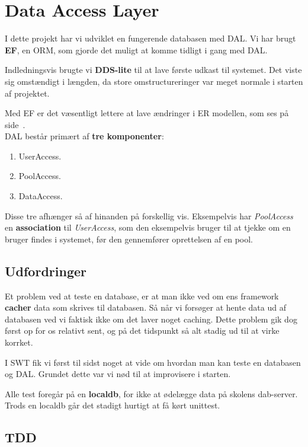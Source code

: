 \section{Data Access Layer}

I dette projekt har vi udviklet en fungerende databasen med DAL. Vi har brugt \textbf{EF}, en ORM, som gjorde det muligt at komme tidligt i gang med DAL. 

Indledningsvis brugte vi \textbf{DDS-lite} til at lave første udkast til systemet. Det viste sig omstændigt i længden, da store omstructureringer var meget normale i starten af projektet. 

Med EF er det væsentligt lettere at lave ændringer i ER modellen, som ses på side~\pageref{fig:dbmodel}.\\

DAL består primært af \textbf{tre komponenter}: 

\begin{enumerate}
	\item UserAccess.
	\item PoolAccess.
	\item DataAccess.
\end{enumerate}

Disse tre afhænger så af hinanden på forskellig vis. Eksempelvis har \textit{PoolAccess} en \textbf{association} til \textit{UserAccess}, som den eksempelvis bruger til at tjekke om en bruger findes i systemet, før den gennemfører oprettelsen af en pool.

\subsection{Udfordringer}

Et problem ved at teste en database, er at man ikke ved om ens framework \textbf{cacher} data som skrives til databasen. Så når vi forsøger at hente data ud af databasen ved vi faktisk ikke om det laver noget caching. Dette problem gik dog først op for os relativt sent, og på det tidspunkt så alt stadig ud til at virke korrket.

I SWT fik vi først til sidst noget at vide om hvordan man kan teste en databasen og DAL. Grundet dette var vi nød til at improvisere i starten. 

Alle test foregår på en \textbf{localdb}, for ikke at ødelægge data på skolens dab-server. Trods en localdb går det stadigt hurtigt at få kørt unittest.

\subsection{TDD}

